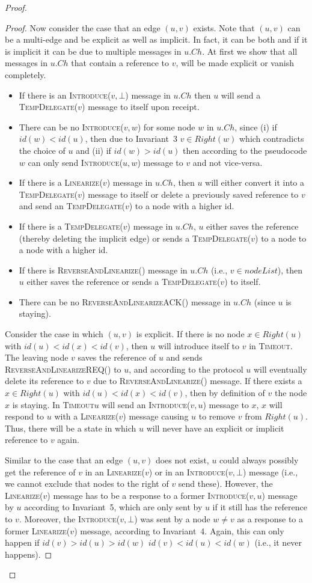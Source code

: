 \documentclass[a4paper,USenglish]{lipics}
\newcommand{\linearize}[1]{\textsc{Linearize(\ensuremath{#1})}\xspace}
\newcommand{\introduce}[1]{\textsc{Introduce(\ensuremath{#1})}\xspace}
\newcommand{\tempdelegate}[1]{\textsc{TempDelegate(\ensuremath{#1})}\xspace}
\newcommand{\timeout}{\textsc{Timeout}\xspace}
\newcommand{\revandlin}[1]{\textsc{ReverseAndLinearize(\ensuremath{#1})}\xspace} \newcommand{\revandlinREQ}[1]{\textsc{ReverseAndLinearizeREQ(#1)}\xspace}
\newcommand{\revandlinACK}[1]{\textsc{ReverseAndLinearizeACK(#1)}\xspace}
\begin{document}
\begin{proof}
\begin{proof}
Now consider the case that an edge $(u,v)$ exists.
Note that $(u,v)$ can be a multi-edge and be explicit as well as implicit. 
In fact, it can be both and if it is implicit it can be due to multiple messages in $u.Ch$.
At first we show that all messages in $u.Ch$ that contain a reference to $v$, will be made explicit or vanish completely.
\begin{itemize}
\item If there is an \introduce{v,\bot} message in $u.Ch$ then $u$ will send a \tempdelegate{v} message to itself upon receipt.
\item There can be no \introduce{v,w} for some node $w$ in $u.Ch$, since (i) if $id(w)<id(u)$, then due to Invariant~3 $v \in Right(w)$ which contradicts the choice of $u$ and (ii) if $id(w)>id(u)$ then according to the pseudocode $w$ can only send \introduce{u,w} message to $v$ and not vice-versa.
\item If there is a \linearize{v} message in $u.Ch$, then $u$ will either convert it into a \tempdelegate{v} message to itself or delete a previously saved reference to $v$ and send an \tempdelegate{v} to a node with a higher id.
\item If there is a \tempdelegate{v} message in $u.Ch$, $u$ either saves the reference (thereby deleting the implicit edge) or sends a \tempdelegate{v} to a node to a node with a higher id.
\item If there is \revandlin{} message in $u.Ch$ (i.e., $v \in nodeList$), then $u$ either saves the reference or sends  a \tempdelegate{v} to itself.
\item There can be no \revandlinACK{} message in $u.Ch$  (since $u$ is staying).
\end{itemize}
Consider the case in which $(u,v)$ is explicit.
If there is no node $x \in Right(u)$ with $id(u) < id(x) < id(v)$, then $u$ will introduce itself to $v$ in \timeout. 
The leaving node $v$ saves the reference of $u$ and sends \revandlinREQ{} to $u$, and according to the protocol $u$ will eventually delete its reference to $v$ due to \revandlin{} message.
If there exists a $x \in Right(u)$ with $id(u) < id(x) < id(v)$, then by definition of $v$ the node $x$ is staying.
In \timeout $u$ will send an \introduce{v,u} message to $x$, $x$ will respond to $u$ with a \linearize{v} message causing $u$ to remove $v$ from $Right(u)$.
Thus, there will be a state in which $u$ will never have an explicit or implicit reference to $v$ again.

Similar to the case that an edge $(u,v)$ does not exist, $u$ could always possibly get the reference of $v$ in an \linearize{v} or in an \introduce{v,\bot} message (i.e., we cannot exclude that nodes to the right of $v$ send these). 
However, the \linearize{v} message has to be a response to a former \introduce{v,u} message by $u$ according to Invariant~5, which are only sent by $u$ if it still has the reference to $v$.
Moreover, the \introduce{v,\bot} was sent by a node $w\neq v$ as a response to a former \linearize{v} message, according to Invariant~4.
Again, this can only happen if $id(v)>id(u)>id(w)$  $id(v)<id(u)<id(w)$ (i.e., it never happens). 


\end{proof}
\end{proof}
\end{document}
